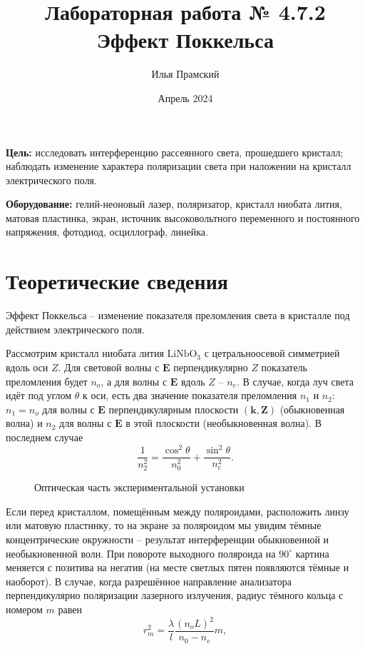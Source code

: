 \documentclass[a4paper,12pt]{article}
\title{Лабораторная работа № 4.7.2\\Эффект Поккельса}
\author{Илья Прамский}
\date{Апрель 2024}
\begin{document}
\maketitle
\newpage

\textbf{Цель:} исследовать интерференцию рассеянного света, прошедшего кристалл; наблюдать изменение характера поляризации света при наложении на кристалл электрического поля.

\textbf{Оборудование:} гелий-неоновый лазер, поляризатор, кристалл ниобата лития, матовая пластинка, экран, источник высоковольтного переменного и постоянного напряжения, фотодиод, осциллограф, линейка.

\section{Теоретические сведения}
Эффект Поккельса -- изменение показателя преломления света в кристалле под действием электрического поля.

Рассмотрим кристалл ниобата лития $\text{LiNbO}_3$ с цетральноосевой симметрией вдоль оси $Z$. Для световой волны с $\mathbf{E}$ перпендикулярно $Z$ показатель преломления будет $n_o$, а для волны с $\mathbf{E}$ вдоль $Z$ -- $n_e$. В случае, когда луч света идёт под углом $\theta$ к оси, есть два значение показателя преломления $n_1$ и $n_2$: $n_1 = n_o$ для волны с $\mathbf{E}$ перпендикулярным плоскости $(\mathbf{k},\mathbf{Z})$ (обыкновенная волна) и $n_2$ для волны с $\mathbf{E}$ в этой плоскости (необыкновенная волна). В последнем случае
\begin{equation}
\dfrac{1}{n_2^2}=\dfrac{\cos^2 \theta}{n_0^2}+\dfrac{\sin^2 \theta}{n_e^2}.
\end{equation}

\begin{figure}[h]
  \caption{\centering Оптическая часть экспериментальной установки}
	\label{fig:image1}
\end{figure}

Если перед кристаллом, помещённым между поляроидами, расположить линзу или матовую пластинку, то на экране за поляроидом мы увидим тёмные концентрические окружности -- результат интерференции обыкновенной и необыкновенной волн. При повороте выходного поляроида на $90^\circ$ картина меняется с позитива на негатив (на месте светлых пятен появляются тёмные и наоборот). В случае, когда разрешённое направление анализатора перпендикулярно поляризации лазерного излучения, радиус тёмного кольца с номером $m$ равен
\begin{equation}
r_m^2 = \dfrac{\lambda}{l} \dfrac{(n_oL)^2}{n_0 - n_e}m,
\end{equation}
\end{document}
